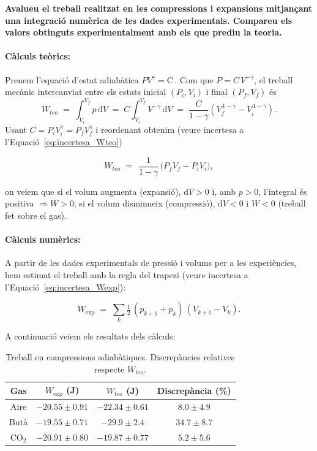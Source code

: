 \documentclass[a4paper,twoside,12pt]{article}
\theoremstyle{definition}
\begin{document}
	
	\textbf{Avalueu el treball realitzat en les compressions i expansions mitjançant una integració
		numèrica de les dades experimentals. Compareu els valors obtinguts experimentalment
		amb els que prediu la teoria.}
	
	
	\paragraph{Càlculs teòrics:}
	Prenem l'equació d'estat adiabàtica
	$
	PV^{\gamma}=\mathrm{C}\,.
	$
	Com que $P =C\,V^{-\gamma}$, el treball mecànic intercanviat entre els estats inicial $(P_i,V_i)$ i final $(P_f,V_f)$ és
	\[
	W_{teo} \;=\; \int_{V_i}^{V_f} p\,\mathrm{d}V
	\;=\; C\!\int_{V_i}^{V_f} V^{-\gamma}\,\mathrm{d}V
	\;=\; \frac{C}{1-\gamma}\!\left(V_f^{\,1-\gamma}-V_i^{\,1-\gamma}\right).
	\]
	Usant $C=P_iV_i^{\gamma}=P_fV_f^{\gamma}$ i reordenant obtenim (veure incertesa a l'Equació~\ref{eq:incertesa_Wteo})
	
	\begin{equation}
		\label{eq:wteo}
		W_{teo} \;=\; \,\frac{1}{1-\gamma}\,\big(P_fV_f - P_iV_i\big),
	\end{equation}
		
	on veiem que si el volum augmenta (expansió), $\mathrm dV>0$ i, amb $p>0$, l’integral és positiva $\Rightarrow W>0$; si el volum disminueix (compressió), $\mathrm dV<0$ i $W<0$ (treball fet sobre el gas).
	
	\paragraph{Càlculs numèrics:}
	A partir de les dades experimentals de pressió i volums per a les experiències, hem estimat el treball amb la regla del trapezi (veure incertesa a l'Equació~\ref{eq:incertesa_Wexp}):
	
	\begin{equation}
		\label{eq:exp}
		W_{\mathrm{exp}}\; = \;\sum_{k}\tfrac{1}{2}\,(p_{k+1}+p_k)\,(V_{k+1}-V_k).
	\end{equation}
	
	
	A continuació veiem els resultats dels càlculs:
	
	\begin{table}[h]
		\centering
		\caption{Treball en compressions adiabàtiques. Discrepàncies relatives respecte $W_{teo}$.}
		\begin{tabular}{|c|ccc|}
			\hline
			Gas & $W_{\mathrm{exp}}$ (J) & $W_{\mathrm{teo}}$ (J) & Discrepància (\%) \\
			\hline
			Aire & $-20.55 \pm 0.91$ & $-22.34 \pm 0.61$ & $8.0 \pm 4.9$ \\
			Butà & $-19.55\pm 0.71$ & $-29.9 \pm 2.4$ & $34.7 \pm 8.7$ \\
			CO$_2$ & $-20.91\pm 0.80$ & $-19.87 \pm 0.77$ & $5.2 \pm 5.6$ \\
			\hline
		\end{tabular}
		\label{tab:work_compressions}
	\end{table}
	
\end{document}
